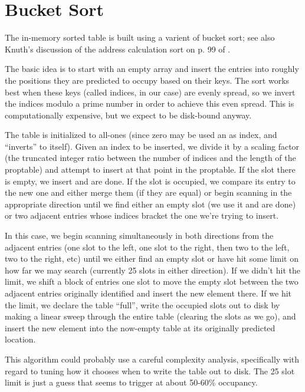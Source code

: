 \documentclass[11pt]{article}
\begin{document}
\section{Bucket Sort}

The in-memory sorted table is built using a varient of bucket sort;
see also Knuth's discussion of the address calculation sort on p. 99 of
\cite{knuth}.

The basic idea is to start with an empty array and insert the entries
into roughly the positions they are predicted to occupy based on their
keys.  The sort works best when these keys (called indices, in our
case) are evenly spread, so we invert the indices modulo a prime
number in order to achieve this even spread.  This is computationally
expensive, but we expect to be disk-bound anyway.

The table is initialized to all-ones (since zero may be used an as
index, and ``inverts'' to itself).  Given an index to be inserted, we
divide it by a scaling factor (the truncated integer ratio between the
number of indices and the length of the proptable) and attempt to
insert at that point in the proptable.  If the slot there is empty, we
insert and are done.  If the slot is occupied, we compare its entry to
the new one and either merge them (if they are equal) or begin
scanning in the appropriate direction until we find either an empty
slot (we use it and are done) or two adjacent entries whose indices
bracket the one we're trying to insert.

In this case, we begin scanning simultaneously in both directions from
the adjacent entries (one slot to the left, one slot to the right,
then two to the left, two to the right, etc) until we either find an
empty slot or have hit some limit on how far we may search (currently
25 slots in either direction).  If we didn't hit the limit, we shift a
block of entries one slot to move the empty slot between the two
adjacent entries originally identified and insert the new element
there.  If we hit the limit, we declare the table ``full'', write the
occupied slots out to disk by making a linear sweep through the entire
table (clearing the slots as we go), and insert the new element
into the now-empty table at its originally predicted location.

This algorithm could probably use a careful complexity analysis,
specifically with regard to tuning how it chooses when to write the
table out to disk.  The 25 slot limit is just a guess that seems
to trigger at about 50-60\% occupancy.
\end{document}
